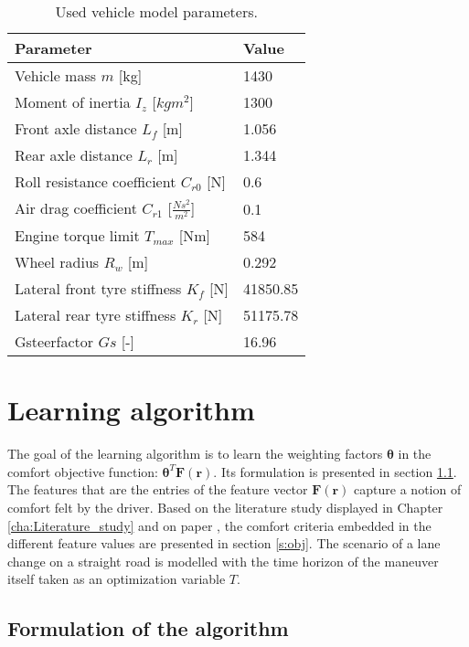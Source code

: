 \begin{table}[h]
	\centering
	\begin{tabular}{|p{5cm}|p{2cm}|}
		\hline
		\textbf{Parameter} & \textbf{Value}\\ \hline	
		Vehicle mass $m$ [kg] & 1430\\ \hline
		Moment of inertia $I_z$ [$kgm^2$] & 1300\\ \hline
		Front axle distance $L_f$ [m] & 1.056\\ \hline
		Rear axle distance $L_r$ [m] & 1.344\\ \hline
		Roll resistance coefficient $C_{r0}$ [N] & 0.6\\ \hline
		Air drag coefficient $C_{r1}$ [$\frac{Ns^2}{m^2}$] & 0.1\\ \hline
		Engine torque limit $T_{max}$ [Nm] & 584\\ \hline
		Wheel radius $R_w$ [m] & 0.292\\ \hline
		Lateral front tyre stiffness $K_{f}$ [N] & 41850.85\\ \hline
		Lateral rear tyre stiffness $K_{r}$ [N] & 51175.78\\ \hline
		Gsteerfactor $Gs$ [-] &16.96 \\ \hline
		
	\end{tabular}
	\caption{Used vehicle model parameters.}
	\label{table:vehicel_model_param}
\end{table}
\newpage
\section{Learning algorithm} 
\label{s:learning_alg}
The goal of the learning algorithm is to learn the weighting factors $\bm{\theta}$ in the comfort objective function: $\bm{\theta}^T\bm{F}(\bm{r})$. Its formulation is presented in section \ref{s:flow alg}. The features that are the entries of the feature vector $\bm{F}(\bm{r})$ capture a notion of comfort felt by the driver. Based on the literature study displayed in Chapter \ref{cha:Literature_study} and on paper \cite{Kuderer2015a}, the comfort criteria embedded in the different feature values are presented in section \ref{s:obj}. The scenario of a lane change on a straight road is modelled with the time horizon of the maneuver itself taken as an optimization variable $T$.


\subsection{Formulation of the algorithm}\label{s:flow alg}

